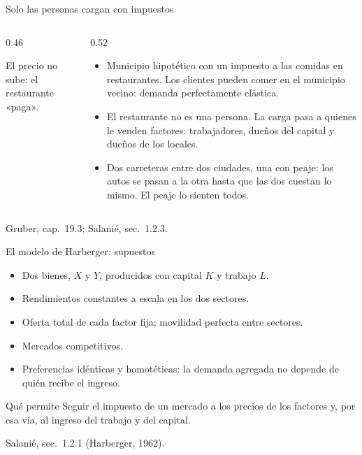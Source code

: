 \documentclass[aspectratio=169,11pt]{beamer}
\newcommand{\fuente}[1]{\par\vfill{\small\color{cGris}#1\par}}
\newcommand{\ejes}[4]{%
  \draw[eje] (0,0) -- (#1,0) node[below] {#3};
  \draw[eje] (0,0) -- (0,#2) node[left] {#4};}
\begin{document}
\begin{frame}{Solo las personas cargan con impuestos}
  \begin{columns}[T]
    \begin{column}{0.46\textwidth}
      \centering
      \par\small El precio no sube: el restaurante «paga».
    \end{column}
    \begin{column}{0.52\textwidth}
      \begin{itemize}
        \item Municipio hipotético con un impuesto a las comidas en restaurantes. Los clientes pueden comer en el municipio vecino: demanda perfectamente elástica.
        \pause
        \item El restaurante no es una persona. La carga pasa a quienes le venden factores: trabajadores, dueños del capital y dueños de los locales.
        \pause
        \item Dos carreteras entre dos ciudades, una con peaje: los autos se pasan a la otra hasta que las dos cuestan lo mismo. El peaje lo sienten todos.
      \end{itemize}
    \end{column}
  \end{columns}
  \fuente{Gruber, cap.~19.3; Salanié, sec.~1.2.3.}
\end{frame}

\begin{frame}{El modelo de Harberger: supuestos}
  \begin{itemize}
    \item Dos bienes, $X$ y $Y$, producidos con capital $K$ y trabajo $L$.
    \item Rendimientos constantes a escala en los dos sectores.
    \item Oferta total de cada factor fija; movilidad perfecta entre sectores.
    \item Mercados competitivos.
    \item Preferencias idénticas y homotéticas: la demanda agregada no depende de quién recibe el ingreso.
  \end{itemize}
  \pause
  \begin{block}{Qué permite}
    Seguir el impuesto de un mercado a los precios de los factores y, por esa vía, al ingreso del trabajo y del capital.
  \end{block}
  \fuente{Salanié, sec.~1.2.1 (Harberger, 1962).}
\end{frame}
\end{document}
